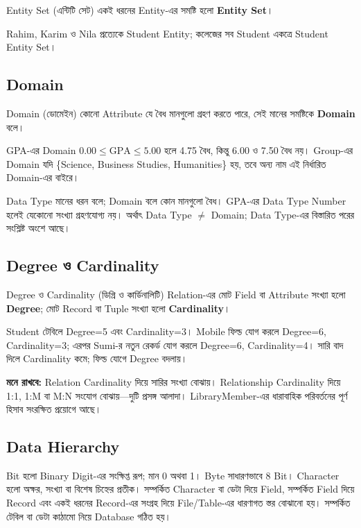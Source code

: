 \begin{definitionbox}{Entity Set (এন্টিটি সেট)}
একই ধরনের Entity-এর সমষ্টি হলো \textbf{Entity Set}।
\end{definitionbox}
Rahim, Karim ও Nila প্রত্যেকে Student Entity; কলেজের সব Student একত্রে Student Entity Set।

\subsection{Domain}
\begin{definitionbox}{Domain (ডোমেইন)}
কোনো Attribute যে বৈধ মানগুলো গ্রহণ করতে পারে, সেই মানের সমষ্টিকে \textbf{Domain} বলে।
\end{definitionbox}
GPA-এর Domain $0.00\leq\mathrm{GPA}\leq5.00$ হলে 4.75 বৈধ, কিন্তু 6.00 ও 7.50 বৈধ নয়। Group-এর Domain যদি \{Science, Business Studies, Humanities\} হয়, তবে অন্য নাম এই নির্ধারিত Domain-এর বাইরে।

Data Type মানের ধরন বলে; Domain বলে কোন মানগুলো বৈধ। GPA-এর Data Type Number হলেই যেকোনো সংখ্যা গ্রহণযোগ্য নয়। অর্থাৎ Data Type $\ne$ Domain; Data Type-এর বিস্তারিত পরের সংশ্লিষ্ট অংশে আছে।

\subsection{Degree ও Cardinality}
\begin{definitionbox}{Degree ও Cardinality (ডিগ্রি ও কার্ডিনালিটি)}
Relation-এর মোট Field বা Attribute সংখ্যা হলো \textbf{Degree}; মোট Record বা Tuple সংখ্যা হলো \textbf{Cardinality}।
\end{definitionbox}
Student টেবিলে Degree=5 এবং Cardinality=3। Mobile ফিল্ড যোগ করলে Degree=6, Cardinality=3; এরপর Sumi-র নতুন রেকর্ড যোগ করলে Degree=6, Cardinality=4। সারি বাদ দিলে Cardinality কমে; ফিল্ড যোগে Degree বদলায়।

\textbf{মনে রাখবে:} Relation Cardinality দিয়ে সারির সংখ্যা বোঝায়। Relationship Cardinality দিয়ে 1:1, 1:M বা M:N সংযোগ বোঝায়—দুটি প্রসঙ্গ আলাদা। LibraryMember-এর ধারাবাহিক পরিবর্তনের পূর্ণ হিসাব সংরক্ষিত প্রয়োগে আছে।

\subsection{Data Hierarchy}
Bit হলো Binary Digit-এর সংক্ষিপ্ত রূপ; মান 0 অথবা 1। Byte সাধারণভাবে 8 Bit। Character হলো অক্ষর, সংখ্যা বা বিশেষ চিহ্নের প্রতীক। সম্পর্কিত Character বা ডেটা দিয়ে Field, সম্পর্কিত Field দিয়ে Record এবং একই ধরনের Record-এর সংগ্রহ দিয়ে File/Table-এর ধারণাগত স্তর বোঝানো হয়। সম্পর্কিত টেবিল বা ডেটা কাঠামো নিয়ে Database গঠিত হয়।

